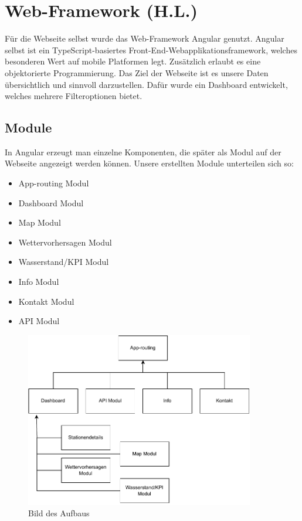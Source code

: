 \section{Web-Framework (H.L.)}

Für die Webseite selbst wurde das Web-Framework Angular \cite{angular} genutzt. Angular selbst ist ein TypeScript-basiertes Front-End-Webapplikationsframework, welches besonderen Wert auf mobile Platformen legt. Zusätzlich erlaubt es eine objektorierte Programmierung.  
Das Ziel der Webseite ist es unsere Daten übersichtlich und sinnvoll darzustellen. Dafür wurde ein Dashboard entwickelt, welches mehrere Filteroptionen bietet.


\subsection{Module}

In Angular erzeugt man einzelne Komponenten, die später als Modul auf der Webseite angezeigt werden können. Unsere erstellten Module unterteilen sich so:

\begin{itemize}
    \item App-routing Modul
    \item Dashboard Modul
    \item Map Modul
    \item Wettervorhersagen Modul
    \item Wasserstand/KPI Modul
    \item Info Modul
    \item Kontakt Modul
    \item API Modul
\end{itemize}

\begin{figure}[!htb]
 \centering
 \includegraphics[width=10cm]{figures/Build.pdf}
 \caption{Bild des Aufbaus}
 \label{fig:Bild des Aufbaus}
\end{figure}

